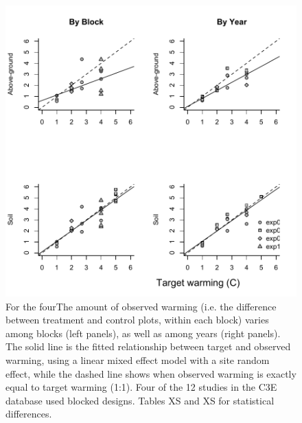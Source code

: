 \documentclass{article}
\begin{document}
 \begin{figure}[p]
   \centering
 \includegraphics{../Analyses/figures/blockyearvar.pdf}  
 \caption{For the fourThe amount of observed warming (i.e. the difference between treatment and control plots, within each block) varies among blocks (left panels), as well as among years (right panels). The solid line is the fitted relationship between target and observed warming, using a linear mixed effect model with a site random effect, while the dashed line shows when observed warming is exactly equal to target warming (1:1). Four of the 12 studies in the C3E database used blocked designs. Tables XS and XS for statistical differences. }%
 \label{fig:blockyear}

 \end{figure}
\clearpage
\end{document}
